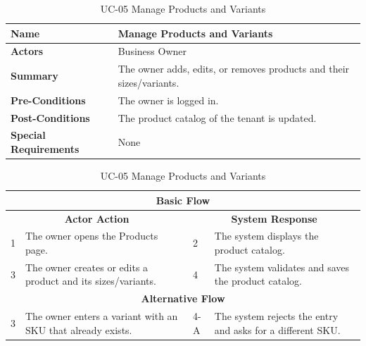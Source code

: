 \documentclass{StockSense}
\begin{document}
\begin{table}[!htbp]
\centering
\caption{UC-05 Manage Products and Variants}
{\small\linespread{1}\selectfont
\begin{tabular}{|p{}|p{}|}
\hline
\textbf{Name} & Manage Products and Variants \\ \hline
\textbf{Actors} & Business Owner \\ \hline
\textbf{Summary} & The owner adds, edits, or removes products and their sizes/variants. \\ \hline
\textbf{Pre-Conditions} & The owner is logged in. \\ \hline
\textbf{Post-Conditions} & The product catalog of the tenant is updated. \\ \hline
\textbf{Special Requirements} & None \\ \hline
\end{tabular}\par\nointerlineskip
\begin{tabular}{|p{}|p{}|p{}|p{}|}
\multicolumn{4}{|c|}{\textbf{Basic Flow}} \\ \hline
\multicolumn{2}{|c|}{\textbf{Actor Action}} & \multicolumn{2}{c|}{\textbf{System Response}} \\ \hline
1 & The owner opens the Products page. & 2 & The system displays the product catalog. \\ \hline
3 & The owner creates or edits a product and its sizes/variants. & 4 & The system validates and saves the product catalog. \\ \hline
\multicolumn{4}{|c|}{\textbf{Alternative Flow}} \\ \hline
3 & The owner enters a variant with an SKU that already exists. & 4-A & The system rejects the entry and asks for a different SKU. \\ \hline
\end{tabular}\par}
\end{table}
\end{document}
